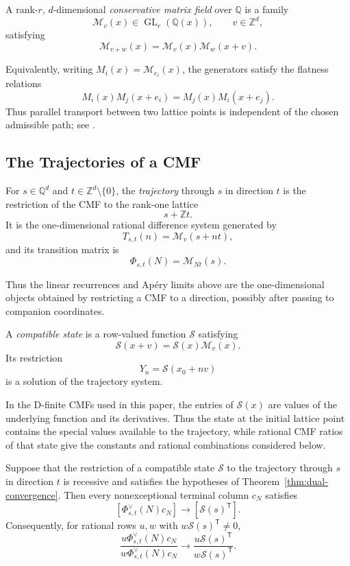 \documentclass[oneside,english,11pt]{amsart}
\begin{document}
\begin{defn}
\label{def:CMF}
A rank-$r$, $d$-dimensional \emph{conservative matrix field} over
$\mathbb Q$ is a family
\[
    \mathcal M_v(x)\in\operatorname{GL}_r(\mathbb Q(x)),
    \qquad v\in\mathbb Z^d,
\]
satisfying
\[
    \mathcal M_{v+w}(x)
    =
    \mathcal M_v(x)\mathcal M_w(x+v).
\]
\end{defn}

Equivalently, writing $M_i(x)=\mathcal M_{e_i}(x)$, the generators
satisfy the flatness relations
\[
    M_i(x)M_j(x+e_i)
    =
    M_j(x)M_i(x+e_j).
\]
Thus parallel transport between two lattice points is independent of
the chosen admissible path; see
\cite[Definition~10 and Proposition~2.3]{weinbaum2025conservative}.

\subsection{The Trajectories of a CMF}

\begin{defn}[Trajectory]
\label{def:trajectory}
For $s\in\mathbb Q^d$ and
$t\in\mathbb Z^d\setminus\{0\}$, the \emph{trajectory} through $s$
in direction $t$ is the restriction of the CMF to the rank-one lattice
\[
    s+\mathbb Zt.
\]
It is the one-dimensional rational difference system generated by
\[
    T_{s,t}(n)=\mathcal M_v(s+nt),
\]
and its transition matrix is
\[
    \Phi_{s,t}(N)=\mathcal M_{Nt}(s).
\]
\end{defn}

Thus the linear recurrences and Ap\'ery limits above are the
one-dimensional objects obtained by restricting a CMF to a direction,
possibly after passing to companion coordinates.

A \emph{compatible state} is a row-valued function $\mathcal S$
satisfying
\[
    \mathcal S(x+v)=\mathcal S(x)\mathcal M_v(x).
\]
Its restriction
\[
    Y_n=\mathcal S(x_0+nv)
\]
is a solution of the trajectory system.

In the D-finite CMFs used in this paper, the entries of
$\mathcal S(x)$ are values of the underlying function and its
derivatives.  Thus the state at the initial lattice point contains the
special values available to the trajectory, while rational CMF ratios of
that state give the constants and rational combinations considered
below.

\begin{prop}
\label{prop:cmf-initial-limit}
Suppose that the restriction of a compatible state $\mathcal S$ to the
trajectory through $s$ in direction $t$ is recessive and satisfies
the hypotheses of Theorem~\ref{thm:dual-convergence}.  Then every
nonexceptional terminal column $c_N$ satisfies
\[
    [\Phi_{s,t}^\vee(N)c_N]
    \longrightarrow
    [\mathcal S(s)^{\mathsf T}].
\]
Consequently, for rational rows $u,w$ with
$w\mathcal S(s)^{\mathsf T}\ne0$,
\[
    \frac{u\Phi_{s,t}^\vee(N)c_N}
         {w\Phi_{s,t}^\vee(N)c_N}
    \longrightarrow
    \frac{u\mathcal S(s)^{\mathsf T}}
         {w\mathcal S(s)^{\mathsf T}}.
\]
\end{prop}
\end{document}
